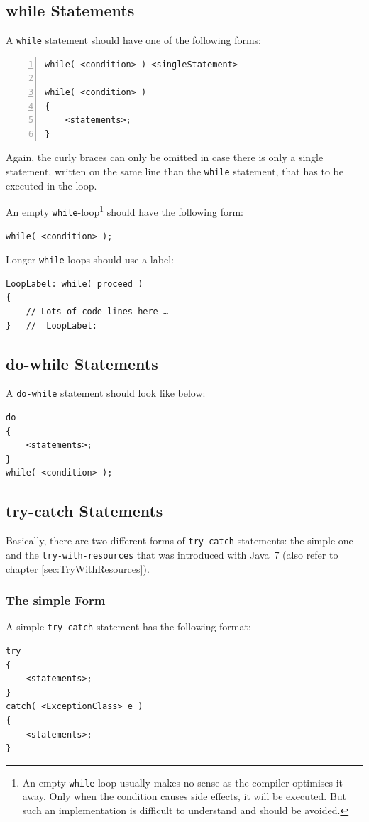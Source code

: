 \documentclass[12pt,a4paper,titlepage, parskip=half, headsepline, footsepline, cleardoubleplain]{scrbook}
\begin{document}
\subsection{while Statements}\label{sec:WhileStatements}
A \lstinline|while| statement should have one of the following forms:
\begin{lstlisting}[numbers=left]
while( <condition> ) <singleStatement>

while( <condition> )
{
    <statements>;
}
\end{lstlisting}

Again, the curly braces can only be omitted in case there is only a single statement, written on the same line than the \lstinline|while| statement, that has to be executed in the loop.

An empty \lstinline|while|-loop\footnote{An empty \lstinline|while|-loop usually makes no sense as the compiler optimises it away. Only when the condition causes side effects, it will be executed. But such an implementation is difficult to understand and should be avoided.} should have the following form: 
\begin{lstlisting}
while( <condition> );
\end{lstlisting}

Longer \lstinline|while|-loops should use a label:
\begin{lstlisting}
LoopLabel: while( proceed )
{
    // Lots of code lines here …
}   //  LoopLabel:
\end{lstlisting}

\subsection{do-while Statements}
A \lstinline|do-while| statement should look like below:
\begin{lstlisting}
do
{
    <statements>;
}
while( <condition> );
\end{lstlisting}

\subsection{try-catch Statements}
Basically, there are two different forms of \lstinline|try-catch| statements: the simple one and the \lstinline|try-with-resources| that was introduced with Java~7 (also refer to chapter \vref{sec:TryWithResources}).

\subsubsection{The simple Form}
A simple \lstinline|try-catch| statement has the following format:
\begin{lstlisting}
try
{
    <statements>;
}
catch( <ExceptionClass> e )
{
    <statements>;
}
\end{lstlisting}
\end{document}
